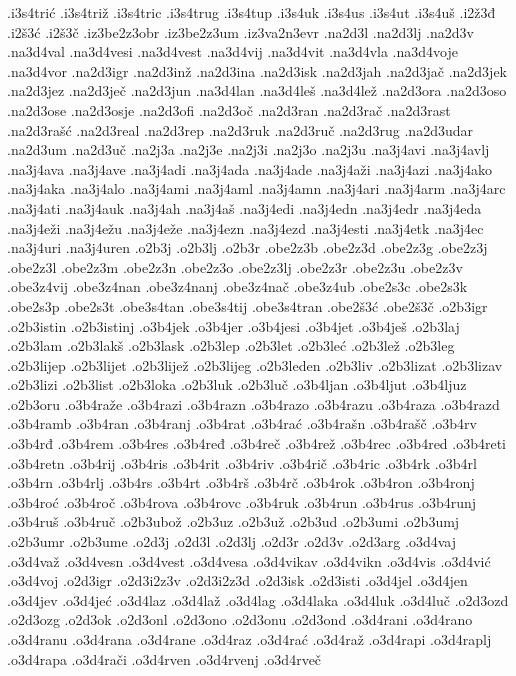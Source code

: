 {.i3s4trić
.i3s4triž
.i3s4tric
.i3s4trug
.i3s4tup
.i3s4uk
.i3s4us
.i3s4ut
.i3s4uš
.i2ž3đ
.i2š3ć
.i2š3č
.iz3be2z3obr
.iz3be2z3um
.iz3va2n3evr
.na2d3l
.na2d3lj
.na2d3v
.na3d4val
.na3d4vesi
.na3d4vest
.na3d4vij
.na3d4vit
.na3d4vla
.na3d4voje
.na3d4vor
.na2d3igr
.na2d3inž
.na2d3ina
.na2d3isk
.na2d3jah
.na2d3jač
.na2d3jek
.na2d3jez
.na2d3ječ
.na2d3jun
.na3d4lan
.na3d4leš
.na3d4lež
.na2d3ora
.na2d3oso
.na2d3ose
.na2d3osje
.na2d3ofi
.na2d3oč
.na2d3ran
.na2d3rač
.na2d3rast
.na2d3rašć
.na2d3real
.na2d3rep
.na2d3ruk
.na2d3ruč
.na2d3rug
.na2d3udar
.na2d3um
.na2d3uč
.na2j3a
.na2j3e
.na2j3i
.na2j3o
.na2j3u
.na3j4avi
.na3j4avlj
.na3j4ava
.na3j4ave
.na3j4adi
.na3j4ada
.na3j4ade
.na3j4aži
.na3j4azi
.na3j4ako
.na3j4aka
.na3j4alo
.na3j4ami
.na3j4aml
.na3j4amn
.na3j4ari
.na3j4arm
.na3j4arc
.na3j4ati
.na3j4auk
.na3j4ah
.na3j4aš
.na3j4edi
.na3j4edn
.na3j4edr
.na3j4eda
.na3j4eži
.na3j4ežu
.na3j4eže
.na3j4ezn
.na3j4ezd
.na3j4esti
.na3j4etk
.na3j4ec
.na3j4uri
.na3j4uren
.o2b3j
.o2b3lj
.o2b3r
.obe2z3b
.obe2z3d
.obe2z3g
.obe2z3j
.obe2z3l
.obe2z3m
.obe2z3n
.obe2z3o
.obe2z3lj
.obe2z3r
.obe2z3u
.obe2z3v
.obe3z4vij
.obe3z4nan
.obe3z4nanj
.obe3z4nač
.obe3z4ub
.obe2s3c
.obe2s3k
.obe2s3p
.obe2s3t
.obe3s4tan
.obe3s4tij
.obe3s4tran
.obe2š3ć
.obe2š3č
.o2b3igr
.o2b3istin
.o2b3istinj
.o3b4jek
.o3b4jer
.o3b4jesi
.o3b4jet
.o3b4ješ
.o2b3laj
.o2b3lam
.o2b3lakš
.o2b3lask
.o2b3lep
.o2b3let
.o2b3leć
.o2b3lež
.o2b3leg
.o2b3lijep
.o2b3lijet
.o2b3lijež
.o2b3lijeg
.o2b3leden
.o2b3liv
.o2b3lizat
.o2b3lizav
.o2b3lizi
.o2b3list
.o2b3loka
.o2b3luk
.o2b3luč
.o3b4ljan
.o3b4ljut
.o3b4ljuz
.o2b3oru
.o3b4raže
.o3b4razi
.o3b4razn
.o3b4razo
.o3b4razu
.o3b4raza
.o3b4razd
.o3b4ramb
.o3b4ran
.o3b4ranj
.o3b4rat
.o3b4rać
.o3b4rašn
.o3b4rašč
.o3b4rv
.o3b4rđ
.o3b4rem
.o3b4res
.o3b4ređ
.o3b4reč
.o3b4rež
.o3b4rec
.o3b4red
.o3b4reti
.o3b4retn
.o3b4rij
.o3b4ris
.o3b4rit
.o3b4riv
.o3b4rič
.o3b4ric
.o3b4rk
.o3b4rl
.o3b4rn
.o3b4rlj
.o3b4rs
.o3b4rt
.o3b4rš
.o3b4rč
.o3b4rok
.o3b4ron
.o3b4ronj
.o3b4roć
.o3b4roč
.o3b4rova
.o3b4rovc
.o3b4ruk
.o3b4run
.o3b4rus
.o3b4runj
.o3b4ruš
.o3b4ruč
.o2b3ubož
.o2b3uz
.o2b3už
.o2b3ud
.o2b3umi
.o2b3umj
.o2b3umr
.o2b3ume
.o2d3j
.o2d3l
.o2d3lj
.o2d3r
.o2d3v
.o2d3arg
.o3d4vaj
.o3d4važ
.o3d4vesn
.o3d4vest
.o3d4vesa
.o3d4vikav
.o3d4vikn
.o3d4vis
.o3d4vić
.o3d4voj
.o2d3igr
.o2d3i2z3v
.o2d3i2z3d
.o2d3isk
.o2d3isti
.o3d4jel
.o3d4jen
.o3d4jev
.o3d4jeć
.o3d4laz
.o3d4laž
.o3d4lag
.o3d4laka
.o3d4luk
.o3d4luč
.o2d3ozd
.o2d3ozg
.o2d3ok
.o2d3onl
.o2d3ono
.o2d3onu
.o2d3ond
.o3d4rani
.o3d4rano
.o3d4ranu
.o3d4rana
.o3d4rane
.o3d4raz
.o3d4rać
.o3d4raž
.o3d4rapi
.o3d4raplj
.o3d4rapa
.o3d4rači
.o3d4rven
.o3d4rvenj
.o3d4rveč
}

